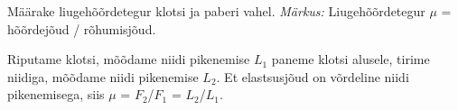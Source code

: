 
Määrake liugehõõrdetegur klotsi ja paberi vahel.
\textit{Märkus:} Liugehõõrdetegur $\mu$ = hõõrdejõud / rõhumisjõud.

\hint

\solu
Riputame klotsi, mõõdame niidi pikenemise $L_1$ paneme klotsi alusele, tirime niidiga, mõõdame niidi pikenemise $L_2$. Et elastsusjõud on võrdeline niidi pikenemisega, siis $\mu$ = $F_2$/$F_1$ = $L_2$/$L_1$.
\probend
